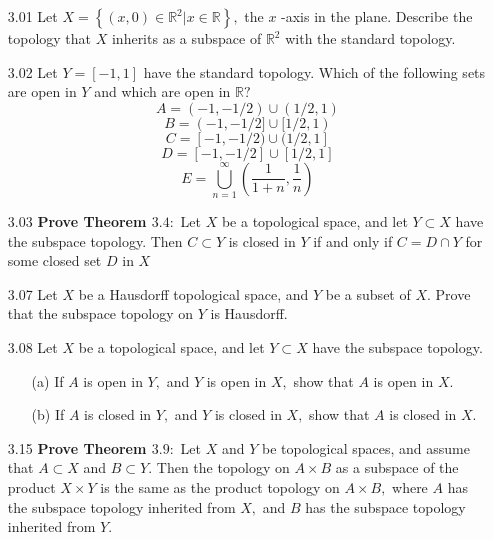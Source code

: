 \documentclass[12pt]{article}
\begin{document}
\pagestyle{fancy}  
\lfoot{} \cfoot{} \rfoot{}

\begin{enumerate}

	\item[3.01] Let $X = \left\{ ( x , 0 ) \in \mathbb { R } ^ { 2 } | x \in \mathbb { R } \right\} ,$ the $x$ -axis in the plane. Describe the topology that $X$ inherits as a subspace of $\mathbb { R } ^ { 2 }$ with the standard topology.

	\item[3.02] Let $Y = [ - 1,1 ]$ have the standard topology. Which of the following sets are open in $Y$ and which are open in $\mathbb { R } ?$\\
		\[A = ( - 1 , - 1 / 2 ) \cup ( 1 / 2,1 )\]
		\[B = ( - 1 , - 1 / 2 ] \cup [ 1 / 2,1 )\]
		\[C = [ - 1 , - 1 / 2 ) \cup ( 1 / 2,1 ]\]
		\[D = [ - 1 , - 1 / 2 ] \cup [ 1 / 2,1 ]\]
		\[E = \bigcup _ { n = 1 } ^ { \infty } \left( \frac { 1 } { 1 + n } , \frac { 1 } { n } \right)\]

	\item[3.03] \textbf{Prove Theorem $3.4 :$ }Let $X$ be a topological space, and let $Y \subset X$ have the subspace topology. Then $C \subset Y$ is closed in $Y$ if and only if $C = D \cap Y$ for some closed set $D$ in $X$

	\item[3.07] Let $X$ be a Hausdorff topological space, and $Y$ be a subset of $X .$ Prove that the subspace topology on $Y$ is Hausdorff.

	\item[3.08] Let $X$ be a topological space, and let $Y \subset X$ have the subspace topology.
		\begin{enumerate}
			\item[(a)] If $A$ is open in $Y ,$ and $Y$ is open in $X ,$ show that $A$ is open in $X .$
			
			\item[(b)] If $A$ is closed in $Y ,$ and $Y$ is closed in $X ,$ show that $A$ is closed in $X .$
			
		\end{enumerate}

	\item[3.15] \textbf{Prove Theorem $3.9 :$} Let $X$ and $Y$ be topological spaces, and assume that $A \subset X$ and $B \subset Y .$ Then the topology on $A \times B$ as a subspace of the product $X \times Y$ is the same as the product topology on $A \times B ,$ where $A$ has the subspace topology inherited from $X ,$ and $B$ has the subspace topology inherited from $Y .$


\end{enumerate}
\end{document}
